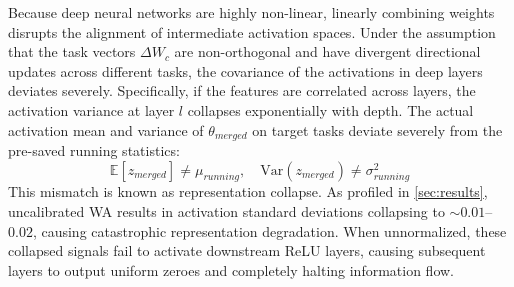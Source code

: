 \documentclass{article}
\theoremstyle{plain}
\theoremstyle{definition}
\theoremstyle{remark}
\begin{document}
Because deep neural networks are highly non-linear, linearly combining weights disrupts the alignment of intermediate activation spaces. Under the assumption that the task vectors $\Delta W_c$ are non-orthogonal and have divergent directional updates across different tasks, the covariance of the activations in deep layers deviates severely. Specifically, if the features are correlated across layers, the activation variance at layer $l$ collapses exponentially with depth. The actual activation mean and variance of $\theta_{merged}$ on target tasks deviate severely from the pre-saved running statistics:
\begin{equation}
    \mathbb{E}[z_{merged}] \neq \mu_{running}, \quad \text{Var}(z_{merged}) \neq \sigma_{running}^2
\end{equation}
This mismatch is known as representation collapse. As profiled in \cref{sec:results}, uncalibrated WA results in activation standard deviations collapsing to $\sim 0.01$--$0.02$, causing catastrophic representation degradation. When unnormalized, these collapsed signals fail to activate downstream ReLU layers, causing subsequent layers to output uniform zeroes and completely halting information flow.
\end{document}
